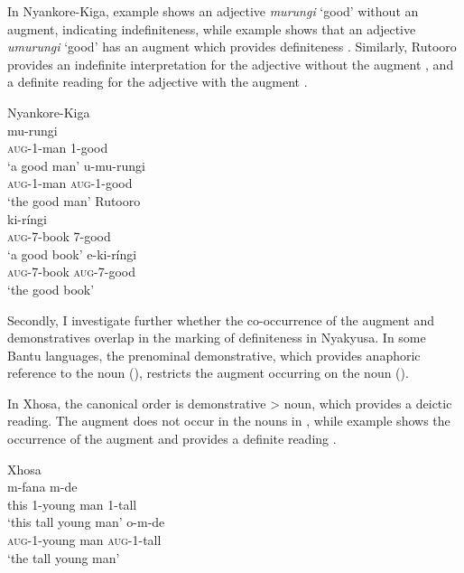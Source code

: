 \documentclass[output=paper]{langscibook}
\begin{document}
In Nyankore-Kiga, example  shows an adjective \textit{murungi} ‘good’ without an augment, indicating indefiniteness, while example  shows that an adjective \textit{umurungi} ‘good’ has an augment which provides definiteness \citep{Asiimwe2014}. Similarly, Rutooro provides an indefinite interpretation for the adjective without the augment , and a definite reading for the adjective with the augment  \citep{Kaji2009}.   

\ea%
    Nyankore-Kiga \citep[120]{Asiimwe2014}\label{ex:lusekelo:29}\\
  {mu-rungi} \\
  \textsc{aug}-1-man  1-good  \\ 
  \glt ‘a good man’  
\ex%
    \label{ex:lusekelo:30}
  {u-mu-rungi} \\
  \textsc{aug}-1-man  \textsc{aug}-1-good    \\
\glt  ‘the good man’
\ex%
   Rutooro \citep[246]{Kaji2009}\label{ex:lusekelo:31}\\
  {ki-ríngi}\\ 
  \textsc{aug}-7-book  7-good \\
\glt  ‘a good book’ 
\ex%
    \label{ex:lusekelo:32}
  {e-ki-ríngi} \\
  \textsc{aug}-7-book  \textsc{aug}-7-good    \\
\glt  ‘the good book’
\z

Secondly, I investigate further whether the co-occurrence of the augment and demonstratives overlap in the marking of definiteness in Nyakyusa. In some Bantu languages, the prenominal demonstrative, which provides anaphoric reference to the noun (\citealt{Rugemalira2007, PetzellKühl2017, Kimambo2018a}), restricts the augment occurring on the noun (\citealt{Visser2002, VandeVelde2005}). 

In Xhosa, the canonical order is demonstrative > noun, which provides a deictic reading. The augment does not occur in the nouns in , while example  shows the occurrence of the augment and provides a definite reading \citep{Visser2002}. 

\ea%
   Xhosa \citep[287]{Visser2002} \label{ex:lusekelo:33}\\
  {m-fana}  {m-de} \\
  this  1-young man  1-tall \\ 
\glt  ‘this tall young man’ 
\ex%
    \label{ex:lusekelo:34}
  {o-m-de}\\
  \textsc{aug}-1-young man  \textsc{aug}-1-tall\\
\glt  ‘the tall young man’
\z
\end{document}

